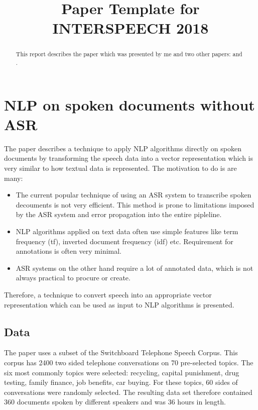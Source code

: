 \documentclass[a4paper]{article}
\title{Paper Template for INTERSPEECH 2018}
\begin{document}
\maketitle
%
\begin{abstract}
  This report describes the paper \cite{dredze2010nlp} which was presented by me and two other papers: \cite{Davis80-COP} and \cite{Davis80-COP}.
\end{abstract}

\section{NLP on spoken documents without ASR}
The paper \cite{dredze2010nlp} describes a technique to apply NLP algorithms directly on spoken documents by transforming the speech data into a vector representation which is very similar to how textual data is represented. The motivation to do is are many:

\begin{itemize}
\item The current popular technique of using an ASR system to transcribe spoken decouments is not very efficient. This method is prone to limitations imposed by the ASR system and error propagation into the entire pipleline.
\item NLP algorithms applied on text data often use simple features like term frequency (tf), inverted document frequency (idf) etc. Requirement for annotations is often very minimal.
\item ASR systems on the other hand require a lot of annotated data, which is not always practical to procure or create.
\end{itemize}

Therefore, a technique to convert speech into an appropriate vector representation which can be used as input to NLP algorithms is presented.

\subsection{Data}
The paper uses a subset of the Switchboard Telephone Speech Corpus. This corpus has 2400 two sided telephone conversations on 70 pre-selected topics. The six most commonly topics were selected: recycling, capital punishment, drug testing, family finance, job benefits, car buying. For these topics, 60 sides of conversations were randomly selected. The resulting data set therefore contained 360 documents spoken by different speakers and was 36 hours in length.
\end{document}
